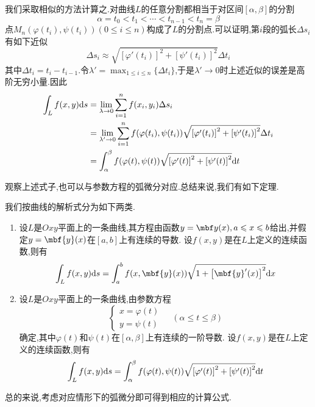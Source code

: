 \documentclass{ctexart}
\begin{document}
\begin{solution}
    我们采取相似的方法计算之.对曲线$L$的任意分割都相当于对区间$[\alpha,\beta]$的分割
    \[\alpha=t_0<t_1<\cdots<t_{n-1}<t_n=\beta\]
    点$M_n(\varphi(t_i),\psi(t_i))(0\leqslant i\leqslant n)$构成了$L$的分割点.可以证明,第$i$段的弧长$\Delta s_i$有如下近似
    \[\Delta s_i\approx\sqrt{\left[\varphi'(t_i)\right]^2+\left[\psi'(t_i)\right]^2}\Delta t_i\]
    其中$\Delta t_i=t_i-t_{i-1}$.令$\displaystyle\lambda'=\max_{1\leqslant i\leqslant n}\{\Delta t_i\}$,于是$\lambda'\to0$时上述近似的误差是高阶无穷小量.因此
    \[\begin{aligned}
        \int_{L}f(x,y)\mathrm{d} s
        &= \lim_{\lambda\to0}\sum_{i=1}^{n}f(x_i,y_i)\Delta s_i \\
        &= \lim_{\lambda'\to0}\sum_{i=1}^{n}f(\varphi(t_i),\psi(t_i))\sqrt{\left[\varphi'(t_i)\right]^2+\left[\psi'(t_i)\right]^2}\Delta t_i \\
        &= \int_\alpha^\beta f(\varphi(t),\psi(t))\sqrt{\left[\varphi'(t)\right]^2+\left[\psi'(t)\right]^2}\mathrm{d} t
    \end{aligned}\]
\end{solution}\noindent
观察上述式子,也可以与参数方程的弧微分对应.总结来说,我们有如下定理.
\begin{formal}[1.5 平面第一型曲线积分的计算]
    我们按曲线的解析式分为如下两类.
    \begin{enumerate}[label=\tbf{\alph*.}]
        \item 设$L$是$Oxy$平面上的一条曲线,其方程由函数$y=\mbf y(x),a\leqslant x\leqslant b$给出,并假定$y=\mbf{y}(x)$在$[a,b]$上有连续的导数.%
            设$f(x,y)$是在$L$上定义的连续函数,则有
            \[\int_{L}f(x,y)\di s=\int_a^bf(x,\mbf{y}(x))\sqrt{1+\left[\mbf{y}'(x)\right]^2}\di x\]
        \item 设$L$是$Oxy$平面上的一条曲线,由参数方程
            \[\left\{\begin{array}{l}
                x=\varphi(t)\\y=\psi(t)
            \end{array}\right.\ \ \ \ \ (\alpha\leqslant t\leqslant\beta)\]
            确定,其中$\varphi(t)$和$\psi(t)$在$[\alpha,\beta]$上有连续的一阶导数.%
            设$f(x,y)$是在$L$上定义的连续函数,则有
            \[\int_{L}f(x,y)\mathrm{d} s=\int_\alpha^\beta f(\varphi(t),\psi(t))\sqrt{\left[\varphi'(t)\right]^2+\left[\psi'(t)\right]^2}\mathrm{d} t\]
    \end{enumerate}
\end{formal}\noindent
总的来说,考虑对应情形下的弧微分即可得到相应的计算公式.\\
\end{document}
